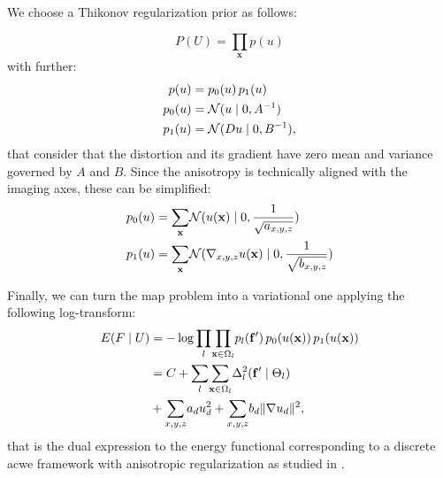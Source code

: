 We choose a Thikonov regularization prior as follows:

\begin{equation*}
P(U) = \underset{\mathbf{x}}{\prod} p(u)
\end{equation*}
with further:
\begin{align*}
p(u) &= p_0(u) \, p_1(u) \notag\\
p_0(u) &= \mathcal{N}( u \mid 0, A^{-1}) \notag\\
p_1(u) &= \mathcal{N}( Du \mid 0, B^{-1}),
\end{align*}
that consider that the distortion and its gradient have zero
mean and variance governed by $A$ and $B$. Since the anisotropy
is technically aligned with the imaging axes, these can
be simplified:
\begin{align}
p_0(u) &= \underset{\mathbf{x}}{\sum} \mathcal{N}( u(\mathbf{x}) \mid 0, \frac{1}{\sqrt{a_{x,y,z}}}) \notag\\
p_1(u) &= \underset{\mathbf{x}}{\sum} \mathcal{N}( \nabla_{x,y,z}u(\mathbf{x}) \mid 0, \frac{1}{\sqrt{b_{x,y,z}}})
\label{eq:priors}
\end{align}

Finally, we can turn the \gls{map} problem into 
a variational one
applying the following log-transform:
\begin{align}
E(F \mid U) &= -\log \underset{l}{\prod}
\underset{\mathbf{x} \in \Omega_l}{\prod} 
p_l( \mathbf{f}')\,p_0( u(\mathbf{x}))\,p_1( u(\mathbf{x})) \notag\\
&= C + \underset{l}{\sum}
\underset{\mathbf{x} \in \Omega_l}{\sum}
\Delta^2_l (\mathbf{f}' \mid \Theta_l ) \notag\\
&+ \underset{x,y,z}{\sum} a_d u^2_d
+ \underset{x,y,z}{\sum} b_d \|\nabla u_d\|^2,
\label{eq:energy}
\end{align}
that is the dual expression to the energy functional corresponding
to a discrete \gls*{acwe} framework \citep{chan_active_2001}
with anisotropic regularization as studied in
\citep{nagel_investigation_1986}.


